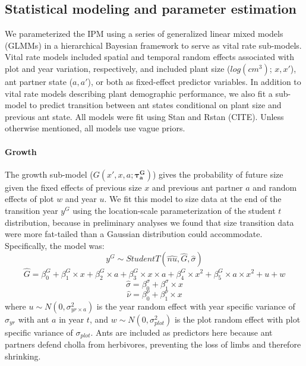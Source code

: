 \documentclass[11pt]{article}
\begin{document}
\subsection*{Statistical modeling and parameter estimation}
We parameterized the IPM using a series of generalized linear mixed models (GLMMs) in a hierarchical Bayesian framework to serve as vital rate sub-models. 
Vital rate models included spatial and temporal random effects associated with plot and year variation, respectively, and included plant size ($log(cm^3)$; $x,x'$), ant partner state ($a,a'$), or both as fixed-effect predictor variables. 
In addition to vital rate models describing plant demographic performance, we also fit a sub-model to predict transition between ant states conditional on plant size and previous ant state. 
All models were fit using Stan and Rstan (CITE). 
Unless otherwise mentioned, all models use vague priors. 

\paragraph{Growth}
The growth sub-model ($G(x',x,a;\pmb{\tau^G_{a}})$) gives the probability of future size given the fixed effects of previous size $x$ and previous ant partner $a$ and random effects of plot $w$ and year $u$. 
We fit this model to size data at the end of the transition year $y^G$ using the location-scale parameterization of the student $t$ distribution, because in preliminary analyses we found that size transition data were more fat-tailed than a Gaussian distribution could accommodate. 
Specifically, the model was: 
$$y^G \sim Student T(\hat{nu},\hat{G},\hat{\sigma}) $$
$$\hat{G} = \beta_{0}^{G} + \beta_{1}^{G} \times x  + \beta_{2}^{G} \times a + \beta_{3}^{G} \times x \times a  + \beta_{4}^{G} \times x^2 + \beta_{5}^{G} \times a \times x^2 + u + w $$
$$\hat{\sigma} = \beta_{0}^{\sigma} + \beta_{1}^{\sigma} \times x $$
$$\hat{\nu} = \beta_{0}^{\nu} + \beta_{1}^{\nu} \times x $$
where $u \sim N(0,\sigma_{yr \times a}^{2})$ is the year random effect with year specific variance of $\sigma_{yr}$ with ant $a$ in year $t$, and $w \sim N(0,\sigma_{plot}^{2})$ is the plot random effect with plot specific variance of $\sigma_{plot}$. 
Ants are included as predictors here because ant partners defend cholla from herbivores, preventing the loss of limbs and therefore shrinking.
\end{document}
